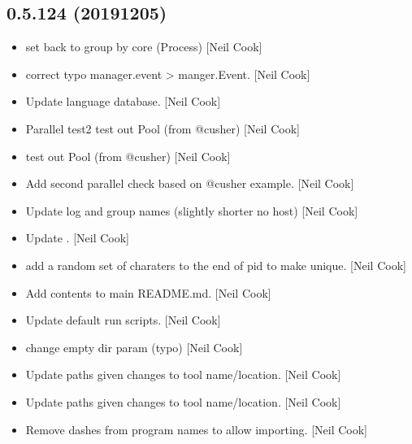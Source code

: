 \documentclass[a4paper,10pt,english]{report}
\begin{document}
\subsection{0.5.124 (2019\sphinxhyphen{}12\sphinxhyphen{}05)}
\label{\detokenize{misc/changelog:id38}}\begin{itemize}
\item {} 
 \sphinxhyphen{} set  back to group
by core (Process) {[}Neil Cook{]}

\item {} 
 \sphinxhyphen{} correct typo manager.event \textendash{}\textgreater{}
manger.Event. {[}Neil Cook{]}

\item {} 
Update language database. {[}Neil Cook{]}

\item {} 
Parallel test2 \sphinxhyphen{} test out Pool (from @cusher) {[}Neil Cook{]}

\item {} 
 \sphinxhyphen{} test out Pool (from @cusher)
{[}Neil Cook{]}

\item {} 
Add second parallel check based on @cusher example. {[}Neil Cook{]}

\item {} 
Update log and group names (slightly shorter \sphinxhyphen{} no host) {[}Neil Cook{]}

\item {} 
Update . {[}Neil Cook{]}

\item {} 
 \sphinxhyphen{} add a random set of charaters to the end of
pid to make unique. {[}Neil Cook{]}

\item {} 
Add contents to main README.md. {[}Neil Cook{]}

\item {} 
Update default run scripts. {[}Neil Cook{]}

\item {} 
 \sphinxhyphen{} change empty dir param (typo) {[}Neil
Cook{]}

\item {} 
Update paths given changes to tool name/location. {[}Neil Cook{]}

\item {} 
Update paths given changes to tool name/location. {[}Neil Cook{]}

\item {} 
Remove dashes from program names to allow importing. {[}Neil Cook{]}

\end{itemize}
\end{document}
